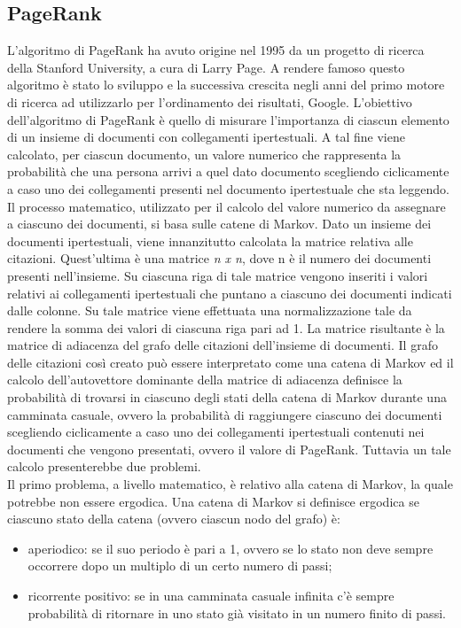 \subsection{PageRank}
L'algoritmo di PageRank \cite{cit_45} ha avuto origine nel 1995 da un progetto di ricerca
della Stanford University, a cura di Larry Page. A rendere famoso questo
algoritmo \`e stato lo sviluppo e la successiva crescita negli anni del primo motore
di ricerca ad utilizzarlo per l'ordinamento dei risultati, Google. L'obiettivo
dell'algoritmo di PageRank \`e quello di misurare l'importanza di ciascun elemento
di un insieme di documenti con collegamenti ipertestuali. A tal fine
viene calcolato, per ciascun documento, un valore numerico che rappresenta la
probabilit\`a che una persona arrivi a quel dato documento scegliendo ciclicamente
a caso uno dei collegamenti presenti nel documento ipertestuale che sta
leggendo. Il processo matematico, utilizzato per il calcolo del valore numerico
da assegnare a ciascuno dei documenti, si basa sulle catene di Markov. Dato
un insieme dei documenti ipertestuali, viene innanzitutto calcolata la matrice
relativa alle citazioni. Quest'ultima \`e una matrice \textit{n x n}, dove n \`e il numero
dei documenti presenti nell'insieme. Su ciascuna riga di tale matrice vengono
inseriti i valori relativi ai collegamenti ipertestuali che puntano a ciascuno dei
documenti indicati dalle colonne. Su tale matrice viene effettuata una normalizzazione
tale da rendere la somma dei valori di ciascuna riga pari ad 1. La
matrice risultante \`e la matrice di adiacenza del grafo delle citazioni dell'insieme
di documenti.
Il grafo delle citazioni cos\`i creato pu\`o essere interpretato come una catena
di Markov ed il calcolo dell'autovettore dominante della matrice di adiacenza
definisce la probabilit\`a di trovarsi in ciascuno degli stati della catena di Markov
durante una camminata casuale, ovvero la probabilit\`a di raggiungere ciascuno
dei documenti scegliendo ciclicamente a caso uno dei collegamenti ipertestuali
contenuti nei documenti che vengono presentati, ovvero il valore di PageRank.
Tuttavia un tale calcolo presenterebbe due problemi.\\
Il primo problema, a livello matematico, \`e relativo alla catena di Markov, la
quale potrebbe non essere ergodica. Una catena di Markov si definisce ergodica
se ciascuno stato della catena (ovvero ciascun nodo del grafo) \`e:
\begin{itemize}
\item aperiodico: se il suo periodo \`e pari a 1, ovvero se lo stato non deve sempre
occorrere dopo un multiplo di un certo numero di passi;
\item ricorrente positivo: se in una camminata casuale infinita c'\`e sempre
probabilit\`a di ritornare in uno stato gi\`a visitato in un numero finito
di passi.
\end{itemize}
